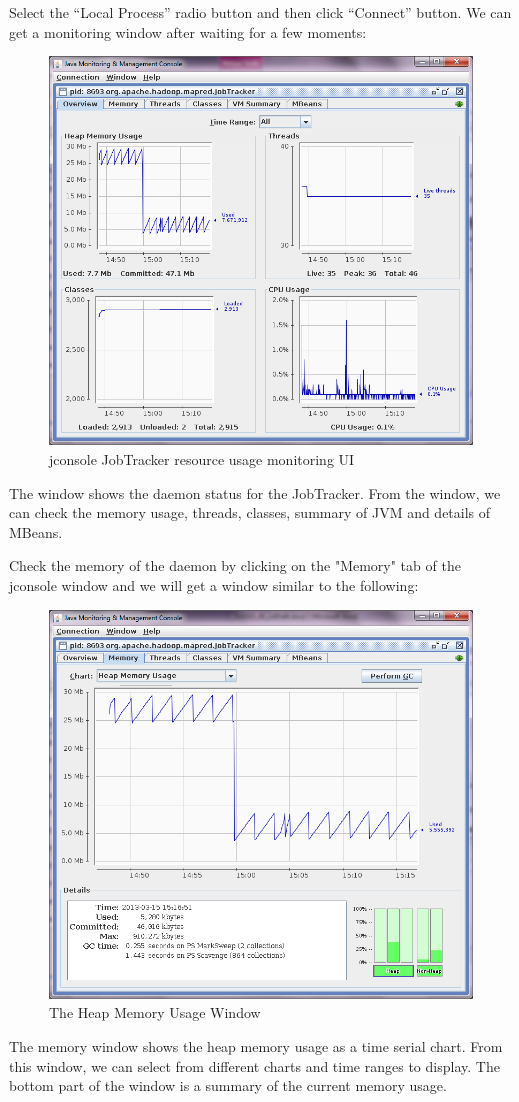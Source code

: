 Select the ``Local Process'' radio button and then click ``Connect'' button. We can get a monitoring window after waiting for a few moments:
\begin{figure}[ht]
  \centering
  \includegraphics[width=.8\textwidth]{figs/5163os_06_02.png}
  \caption{jconsole JobTracker resource usage monitoring UI}\label{fig:jconsole.jobtracker}
\end{figure} 
The window shows the daemon status for the JobTracker. From the window, we can check the memory usage, threads, classes, summary of JVM and details of MBeans.

Check the memory of the daemon by clicking on the "Memory" tab of the jconsole window and we will get a window similar to the following:
\begin{figure}[ht]
  \centering
  \includegraphics[width=.8\textwidth]{figs/5163os_06_03.png}
  \caption{The Heap Memory Usage Window}\label{fig:heap.usage.window}
\end{figure} 
The memory window shows the heap memory usage as a time serial chart. From this window, we can select from different charts and time ranges to display. The bottom part of the window is a summary of the current memory usage.

